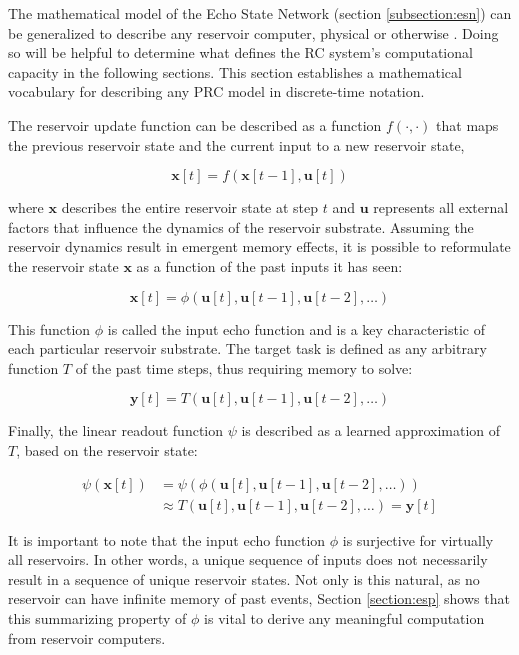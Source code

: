 The mathematical model of the Echo State Network (section \ref{subsection:esn}) can be generalized to describe any reservoir computer, physical or otherwise \citep{nakajima_physical_2020}. 
Doing so will be helpful to determine what defines the RC system's computational capacity in the following sections. 
This section establishes a mathematical vocabulary for describing any PRC model in discrete-time notation.

The reservoir update function can be described as a function $f(\cdot, \cdot)$ that maps the previous reservoir state and the current input to a new reservoir state,
 
\begin{equation} \label{prc:update}
    \mathbf{x}[t] = f\left(\mathbf{x}[t-1], \mathbf{u}[t]\right) 
\end{equation}

where $\mathbf{x}$ describes the entire reservoir state at step $t$ and $\mathbf{u}$ represents all external factors that influence the dynamics of the reservoir substrate. 
Assuming the reservoir dynamics result in emergent memory effects, it is possible to reformulate the reservoir state $\mathbf{x}$ as a function of the past inputs it has seen:

\begin{equation} \label{prc:echo_input_function}
    \mathbf{x}[t] = \phi(\mathbf{u}[t], \mathbf{u}[t-1], \mathbf{u}[t-2], \dots)
\end{equation}

This function $\phi$ is called the input echo function and is a key characteristic of each particular reservoir substrate. The target task is defined as any arbitrary function $T$ of the past time steps, thus requiring memory to solve:

\begin{equation} \label{prc:target}
    \mathbf{y}[t] = T(\mathbf{u}[t], \mathbf{u}[t-1], \mathbf{u}[t-2], \dots)
\end{equation}

Finally, the linear readout function $\psi$ is described as a learned approximation of $T$, based on the reservoir state:

\begin{align} 
    \psi(\mathbf{x}[t]) &= \psi \left( \phi(\mathbf{u}[t], \mathbf{u}[t-1], \mathbf{u}[t-2], \dots) \right) \label{prc:readout} \\
    &\approx T(\mathbf{u}[t], \mathbf{u}[t-1], \mathbf{u}[t-2], \dots) = \mathbf{y}[t] \nonumber
\end{align}

It is important to note that the input echo function $\phi$ is surjective for virtually all reservoirs. 
In other words, a unique sequence of inputs does not necessarily result in a sequence of unique reservoir states. 
Not only is this natural, as no reservoir can have infinite memory of past events, Section \ref{section:esp} shows that this summarizing property of $\phi$ is vital to derive any meaningful computation from reservoir computers.